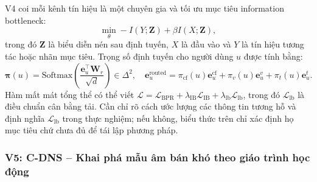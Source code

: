 V4 coi mỗi kênh tín hiệu là một chuyên gia và tối ưu mục tiêu information bottleneck:
\begin{equation}
\min_{\theta} -I(Y; \mathbf{Z}) + \beta I(X; \mathbf{Z}),
\end{equation}
trong đó $\mathbf{Z}$ là biểu diễn nén sau định tuyến, $X$ là đầu vào và $Y$ là tín hiệu tương tác hoặc nhãn mục tiêu. Trọng số định tuyến cho người dùng $u$ được tính bằng:
\begin{equation}
\boldsymbol{\pi}(u) = \text{Softmax}\left(\frac{\mathbf{e}_u^\top \mathbf{W}_r}{\sqrt{d}}\right) \in \Delta^2, \quad \mathbf{e}_u^{\text{routed}} = \pi_{\text{cf}}(u)\mathbf{e}_u^{\text{cf}} + \pi_v(u)\mathbf{e}_u^v + \pi_t(u)\mathbf{e}_u^t.
\end{equation}
Hàm mất mát tổng thể có thể viết $\mathcal{L}=\mathcal{L}_{\text{BPR}}+\lambda_{\text{IB}}\mathcal{L}_{\text{IB}}+\lambda_{\text{lb}}\mathcal{L}_{\text{lb}}$, trong đó $\mathcal{L}_{\text{lb}}$ là điều chuẩn cân bằng tải. Cần chỉ rõ cách ước lượng các thông tin tương hỗ và định nghĩa $\mathcal{L}_{\text{lb}}$ trong thực nghiệm; nếu không, biểu thức trên chỉ xác định họ mục tiêu chứ chưa đủ để tái lập phương pháp.

\subsubsection{V5: C-DNS -- Khai phá mẫu âm bán khó theo giáo trình học động}

